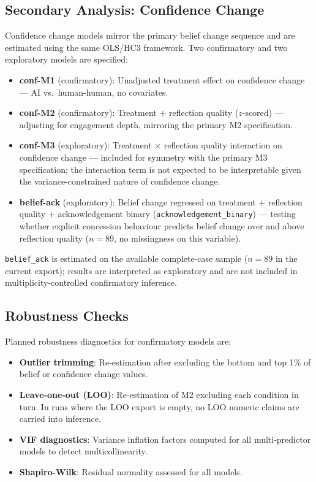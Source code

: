 \subsection{Secondary Analysis: Confidence Change}

Confidence change models mirror the primary belief change sequence and are
estimated using the same OLS/HC3 framework. Two confirmatory and two
exploratory models are specified:

\begin{itemize}
    \item \textbf{conf-M1} (confirmatory): Unadjusted treatment effect on
          confidence change — AI vs.\ human-human, no covariates.
    \item \textbf{conf-M2} (confirmatory): Treatment $+$ reflection quality
          ($z$-scored) — adjusting for engagement depth, mirroring the
          primary M2 specification.
    \item \textbf{conf-M3} (exploratory): Treatment $\times$ reflection
            quality interaction on confidence change — included for
            symmetry with the primary M3 specification; the interaction
            term is not expected to be interpretable given the
            variance-constrained nature of confidence change.
    \item \textbf{belief-ack} (exploratory): Belief change regressed on
        treatment $+$ reflection quality $+$ acknowledgement binary
        (\texttt{acknowledgement\_binary}) — testing whether explicit
        concession behaviour predicts belief change over and above
        reflection quality ($n = 89$, no missingness on this variable).

\end{itemize}

\texttt{belief\_ack} is estimated on the available complete-case sample
($n = 89$ in the current export); results are interpreted as exploratory
and are not included in multiplicity-controlled confirmatory inference.

\subsection{Robustness Checks}

Planned robustness diagnostics for confirmatory models are:
\begin{itemize}
    \item \textbf{Outlier trimming}: Re-estimation after excluding the bottom
          and top 1\% of belief or confidence change values.
    \item \textbf{Leave-one-out (LOO)}: Re-estimation of M2 excluding each
          condition in turn. In runs where the LOO export is empty, no LOO
          numeric claims are carried into inference.
    \item \textbf{VIF diagnostics}: Variance inflation factors computed for
          all multi-predictor models to detect multicollinearity.
    \item \textbf{Shapiro-Wilk}: Residual normality assessed for all models.
\end{itemize}


